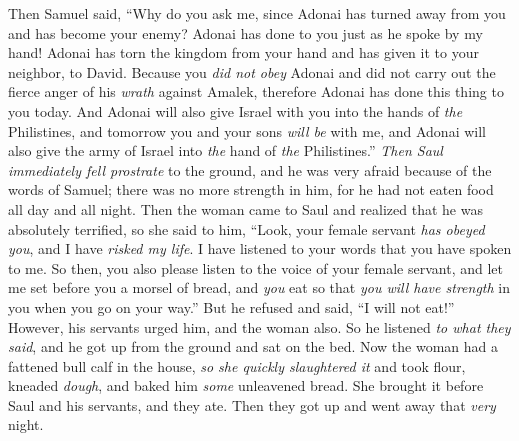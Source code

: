 \begin{biblechapter}
\verse Then Samuel said, “Why do you ask me, since Adonai has turned away from you and has become your enemy?
\verse Adonai has done to you just as he spoke by my hand! Adonai has torn the kingdom from your hand and has given it to your neighbor, to David.
\verse Because you \textit{did not obey} Adonai and did not carry out the fierce anger of his \textit{wrath} against Amalek, therefore Adonai has done this thing to you today.
\verse And Adonai will also give Israel with you into the hands of \textit{the} Philistines, and tomorrow you and your sons \textit{will be} with me, and Adonai will also give the army of Israel into \textit{the} hand of \textit{the} Philistines.”
\verse \textit{Then Saul immediately fell prostrate} to the ground, and he was very afraid because of the words of Samuel; there was no more strength in him, for he had not eaten food all day and all night.
\verse Then the woman came to Saul and realized that he was absolutely terrified, so she said to him, “Look, your female servant \textit{has obeyed you}, and I have \textit{risked my life}. I have listened to your words that you have spoken to me.
\verse So then, you also please listen to the voice of your female servant, and let me set before you a morsel of bread, and \textit{you} eat so that \textit{you will have strength} in you when you go on your way.”
\verse But he refused and said, “I will not eat!” However, his servants urged him, and the woman also. So he listened \textit{to what they said}, and he got up from the ground and sat on the bed.
\verse Now the woman had a fattened bull calf in the house, \textit{so she quickly slaughtered it} and took flour, kneaded \textit{dough}, and baked him \textit{some} unleavened bread.
\verse She brought it before Saul and his servants, and they ate. Then they got up and went away that \textit{very} night.
\end{biblechapter}

